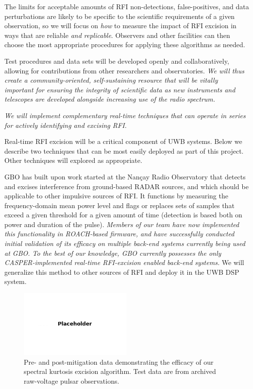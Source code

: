 \documentclass[10pt]{myNSF}
\begin{document}
The limits for acceptable amounts of RFI non-detections,
false-positives, and data perturbations are likely to be specific to
the scientific requirements of a given observation, so we will focus
on \emph{how} to measure the impact of RFI excision in ways that are
reliable \emph{and replicable}.  Observers and other facilities can
then choose the most appropriate procedures for applying these
algorithms as needed.

Test procedures and data sets will be developed openly and
collaboratively, allowing for contributions from other researchers and
observatories.  \emph{We will thus create a community-oriented,
  self-sustaining resource that will be vitally important for ensuring
  the integrity of scientific data as new instruments and telescopes
  are developed alongside increasing use of the radio spectrum.}

\label{sec:rfi_excision}

\emph{We will implement complementary real-time techniques that can
  operate in series for actively identifying and excising RFI.}

Real-time RFI excision will be a critical component of UWB systems.
Below we describe two techniques that can be most easily deployed as
part of this project.  Other techniques will explored as appropriate.

 GBO has built upon
work started at the Nan\c{c}ay Radio Observatory \citep{dwr17} that
detects and excises interference from ground-based RADAR sources, and
which should be applicable to other impulsive sources of RFI.  It
functions by measuring the frequency-domain mean power level and flags
or replaces sets of samples that exceed a given threshold for a given
amount of time (detection is based both on power and duration of the
pulse).  \emph{Members of our team have now implemented this
  functionality in ROACH-based firmware, and have successfully
  conducted initial validation of its efficacy on multiple back-end
  systems currently being used at GBO.  To the best of our knowledge,
  GBO currently possesses the only CASPER-implemented real-time
  RFI-excision enabled back-end systems.}  We will generalize this
method to other sources of RFI and deploy it in the UWB DSP system.

\begin{figure}
  \centering
  \includegraphics[width=0.5\textwidth]{placeholder.png}
  \caption{Pre- and post-mitigation data demonstrating the efficacy of
    our spectral kurtosis excision algorithm.  Test data are from
    archived raw-voltage pulsar observations. \label{fig:sk}}
\end{figure}
\end{document}

